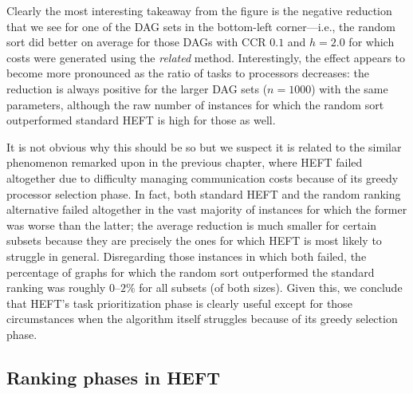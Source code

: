 \documentclass[12pt]{article}
\begin{document}
Clearly the most interesting takeaway from the figure is the negative reduction that we see for one of the DAG sets in the bottom-left corner---i.e., the random sort did better on average for those DAGs with CCR $0.1$ and $h = 2.0$ for which costs were generated using the {\em related} method. Interestingly, the effect appears to become more pronounced as the ratio of tasks to processors decreases: the reduction is always positive for the larger DAG sets ($n = 1000$) with the same parameters, although the raw number of instances for which the random sort outperformed standard HEFT is high for those as well. 

It is not obvious why this should be so but we suspect it is related to the similar phenomenon remarked upon in the previous chapter, where HEFT failed altogether due to difficulty managing communication costs because of its greedy processor selection phase. In fact, both standard HEFT and the random ranking alternative failed altogether in the vast majority of instances for which the former was worse than the latter; the average reduction is much smaller for certain subsets because they are precisely the ones for which HEFT is most likely to struggle in general. Disregarding those instances in which both failed, the percentage of graphs for which the random sort outperformed the standard ranking was roughly $0$--$2\%$ for all subsets (of both sizes). Given this, we conclude that HEFT's task prioritization phase is clearly useful except for those circumstances when the algorithm itself struggles because of its greedy selection phase. 



\subsection{Ranking phases in HEFT}
\label{subsect.evaluation}
\end{document}
